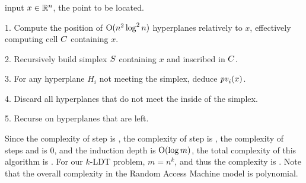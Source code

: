 \documentclass[10pt,xcolor=x11names,dvipsnames,hyperref={colorlinks=false,breaklinks=true,bookmarks=true}]{beamer}
\begin{document}
\begin{frame}\frametitle{\insertsection}\justifying
\begin{algo}
\item[input] $x \in \mathbb{R}^n$, the point to be located.
\item[1.] Compute the position of $\operatorname{O}(n^2 \log^2 n)$ hyperplanes relatively to
$x$, effectively computing cell $C$ containing $x$.
\item[2.] Recursively build simplex $S$ containing $x$ and inscribed in
$C$.
\item[3.] For any hyperplane $H_i$ not meeting the simplex, deduce $\mathit{pv}_i(x)$.
\item[4.] Discard all hyperplanes that do not meet the inside of the
simplex.
\item[5.] Recurse on hyperplanes that are left.
\end{algo}\pause

Since the complexity of step  is , the complexity of step
 is , the complexity of steps  and 
is \(0\),
and the induction depth is $\operatorname{O}(\log m)$, the total complexity of this algorithm
is . For our \(k\)-\textsf{LDT} problem, \(m = n^k\),
and thus the complexity is . Note that the overall
complexity in the Random Access Machine model is polynomial.

\end{frame}
\end{document}
